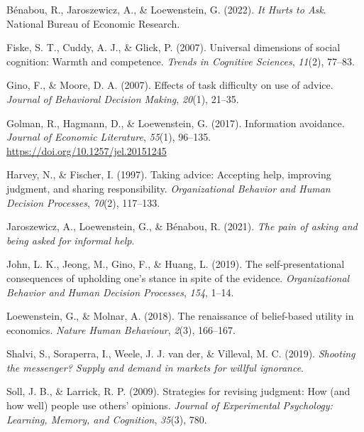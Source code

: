 \documentclass[
  man,
  floatsintext,
  longtable,
  nolmodern,
  notxfonts,
  notimes,
  colorlinks=true,linkcolor=blue,citecolor=blue,urlcolor=blue]{apa7}
\newlength{\cslhangindent}
\newenvironment{CSLReferences}[2] %
 {\begin{list}{}{%
  \setlength{\itemindent}{0pt}
  \setlength{\leftmargin}{0pt}
  \setlength{\parsep}{0pt}
  \ifodd #1
   \setlength{\leftmargin}{\cslhangindent}
   \setlength{\itemindent}{-1\cslhangindent}
  \fi
  \setlength{\itemsep}{#2\baselineskip}}}
 {\end{list}}
\begin{document}
\label{refs}
\begin{CSLReferences}{1}{0}
Bénabou, R., Jaroszewicz, A., \& Loewenstein, G. (2022). \emph{It
{Hurts} to {Ask}}. National Bureau of Economic Research.

Fiske, S. T., Cuddy, A. J., \& Glick, P. (2007). Universal dimensions of
social cognition: Warmth and competence. \emph{Trends in Cognitive
Sciences}, \emph{11}(2), 77--83.

Gino, F., \& Moore, D. A. (2007). Effects of task difficulty on use of
advice. \emph{Journal of Behavioral Decision Making}, \emph{20}(1),
21--35.

Golman, R., Hagmann, D., \& Loewenstein, G. (2017). Information
avoidance. \emph{Journal of Economic Literature}, \emph{55}(1), 96--135.
\url{https://doi.org/10.1257/jel.20151245}

Harvey, N., \& Fischer, I. (1997). Taking advice: {Accepting} help,
improving judgment, and sharing responsibility. \emph{Organizational
Behavior and Human Decision Processes}, \emph{70}(2), 117--133.

Jaroszewicz, A., Loewenstein, G., \& Bénabou, R. (2021). \emph{The pain
of asking and being asked for informal help}.

John, L. K., Jeong, M., Gino, F., \& Huang, L. (2019). The
self-presentational consequences of upholding one's stance in spite of
the evidence. \emph{Organizational Behavior and Human Decision
Processes}, \emph{154}, 1--14.

Loewenstein, G., \& Molnar, A. (2018). The renaissance of belief-based
utility in economics. \emph{Nature Human Behaviour}, \emph{2}(3),
166--167.

Shalvi, S., Soraperra, I., Weele, J. J. van der, \& Villeval, M. C.
(2019). \emph{Shooting the messenger? Supply and demand in markets for
willful ignorance}.

Soll, J. B., \& Larrick, R. P. (2009). Strategies for revising judgment:
How (and how well) people use others' opinions. \emph{Journal of
Experimental Psychology: Learning, Memory, and Cognition}, \emph{35}(3),
780.

\end{CSLReferences}
\end{document}
